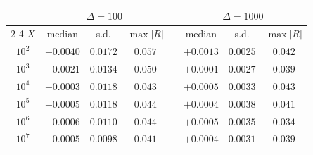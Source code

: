 \begin{tabular}{@{}c ccc c ccc@{}}
\toprule
 & \multicolumn{3}{c}{$\Delta=100$} & & \multicolumn{3}{c}{$\Delta=1000$}\\
\cmidrule{2-4}\cmidrule{6-8}
$X$ & median & s.d. & $\max|R|$ & & median & s.d. & $\max|R|$\\
\midrule
$10^{2}$ & $-0.0040$ & $0.0172$ & $0.057$ & & $+0.0013$ & $0.0025$ & $0.042$\\
$10^{3}$ & $+0.0021$ & $0.0134$ & $0.050$ & & $+0.0001$ & $0.0027$ & $0.039$\\
$10^{4}$ & $-0.0003$ & $0.0118$ & $0.043$ & & $+0.0005$ & $0.0033$ & $0.043$\\
$10^{5}$ & $+0.0005$ & $0.0118$ & $0.044$ & & $+0.0004$ & $0.0038$ & $0.041$\\
$10^{6}$ & $+0.0006$ & $0.0110$ & $0.044$ & & $+0.0005$ & $0.0035$ & $0.034$\\
$10^{7}$ & $+0.0005$ & $0.0098$ & $0.041$ & & $+0.0004$ & $0.0031$ & $0.039$\\
\bottomrule
\end{tabular}
